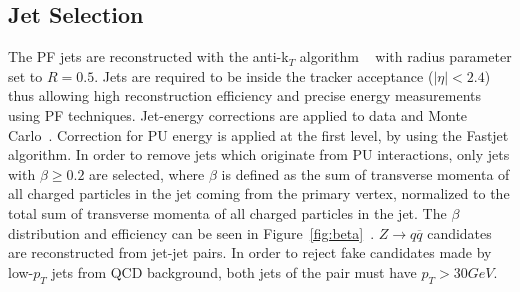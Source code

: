 \subsection{Jet Selection}
\label{sec:jetsel}
The PF jets are reconstructed with the anti-k$_{T}$ algorithm ~\cite{antikt} with radius parameter set to $R=0.5$. Jets are required to be inside the tracker acceptance ($|\eta|<2.4$) thus allowing high reconstruction efficiency and precise energy measurements using PF techniques. Jet-energy corrections are applied to data and Monte Carlo~\cite{CMS-PAS-JME-10-010}. Correction for PU energy is applied at the first level, by using the Fastjet algorithm. In order to remove jets which originate from PU interactions, only jets with $\beta \ge 0.2$ are selected, where $\beta$ is defined as the sum of transverse momenta of all charged particles in the jet coming from the primary vertex, normalized to the total sum of transverse momenta of all charged particles in the jet. The $\beta$ distribution and efficiency can be seen in Figure~\ref{fig:beta}~\cite{2l2q115}. $Z \rightarrow q\overline{q} $ candidates are reconstructed from jet-jet pairs. In order to reject fake candidates made by low-$p_T$ jets from QCD background, both jets of the pair must have $p_T > 30 GeV$.


